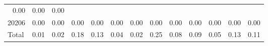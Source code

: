 \begin{table}[!h]
\begin{tabular}{lllllllllllll}
  \multicolumn{1}{r}{0.00} &
  \multicolumn{1}{r}{0.00} &
  \multicolumn{1}{r}{0.00} \\
\multicolumn{1}{l}{\hspace{1em}20206} &
  \multicolumn{1}{|r}{0.00} &
  \multicolumn{1}{r}{0.00} &
  \multicolumn{1}{r}{0.00} &
  \multicolumn{1}{r}{0.00} &
  \multicolumn{1}{r}{0.00} &
  \multicolumn{1}{r}{0.00} &
  \multicolumn{1}{r}{0.00} &
  \multicolumn{1}{r}{0.00} &
  \multicolumn{1}{r}{0.00} &
  \multicolumn{1}{r}{0.00} &
  \multicolumn{1}{r}{0.00} &
  \multicolumn{1}{r}{0.00} \\
\multicolumn{1}{l}{\hspace{1em}Total} &
  \multicolumn{1}{|r}{0.01} &
  \multicolumn{1}{r}{0.02} &
  \multicolumn{1}{r}{0.18} &
  \multicolumn{1}{r}{0.13} &
  \multicolumn{1}{r}{0.04} &
  \multicolumn{1}{r}{0.02} &
  \multicolumn{1}{r}{0.25} &
  \multicolumn{1}{r}{0.08} &
  \multicolumn{1}{r}{0.09} &
  \multicolumn{1}{r}{0.05} &
  \multicolumn{1}{r}{0.13} &
  \multicolumn{1}{r}{0.11} \\
\cline{1-13}
\end{tabular}
\end{table}
